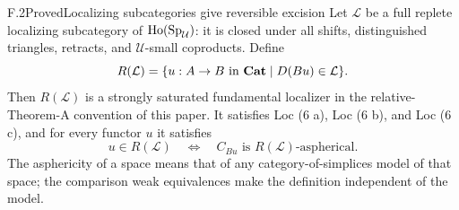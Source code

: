 \begin{claim}{F.2}{Proved}{Localizing subcategories give reversible excision}
Let $\mathcal L$ be a full replete localizing subcategory of
$\operatorname{Ho}(\mathrm{Sp}_{\mathcal U})$: it is closed under all shifts, distinguished
triangles, retracts, and $\mathcal U$-small coproducts. Define
\[
 R(\mathcal L)=\{u:A\to B\text{ in }\mathbf{Cat}\mid D(Bu)\in\mathcal L\}.
\]
Then $R(\mathcal L)$ is a strongly saturated fundamental localizer in the
relative-Theorem-A convention of this paper. It satisfies Loc (6 a),
Loc (6 b), and Loc (6 c), and for every functor $u$ it satisfies
\[
 u\in R(\mathcal L)\quad\Longleftrightarrow\quad
 C_{Bu}\text{ is }R(\mathcal L)\text{-aspherical}.
\]
The asphericity of a space means that of any category-of-simplices model of
that space; the comparison weak equivalences make the definition independent
of the model.
\end{claim}
